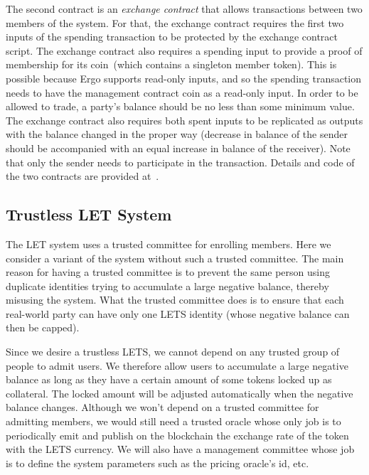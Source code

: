 \documentclass[]{llncs}   %
\begin{document}
The second contract is an {\em exchange contract} that allows transactions between two members of the system. For that, the exchange contract requires the first two inputs of the spending transaction to be protected by the exchange contract script. The exchange contract also requires a spending input to provide a proof of membership for its coin~(which contains a singleton member token). This is possible because Ergo supports read-only inputs, and so the spending transaction needs to have the management contract coin as a read-only input. In order to be allowed to trade, a party's balance should be no less than some minimum value. The exchange contract also requires both spent inputs to be replicated as outputs with the balance changed in the proper way (decrease in balance of the sender should be accompanied with an equal increase in balance of the receiver). Note that only the sender needs to participate in the transaction. Details and code of the two contracts are provided at~\cite{lets-trusted}.


\subsection{Trustless LET System}
\label{sec-trustless}

The LET system uses a trusted committee for enrolling members. Here we consider a variant of the system without 
such a trusted committee. The main reason for having a trusted committee is to prevent the same person using duplicate identities trying to accumulate a large negative balance, thereby misusing the system. What the trusted committee does is to ensure that each real-world party can have only one LETS identity (whose negative balance can then be capped). 
 
 
Since we desire a trustless LETS, we cannot depend on any trusted group of people to admit users. We therefore allow users to accumulate a large negative balance as long as they have a certain amount of some tokens locked up as collateral. The locked amount will be adjusted automatically when the negative balance changes. Although we won't depend on a trusted committee for admitting members, we would still need a trusted oracle whose only job is to periodically emit and publish on the blockchain the exchange rate of the token with the LETS currency. 
We will also have a management committee whose job is to define the system parameters such as the pricing oracle's id, etc.
\end{document}

